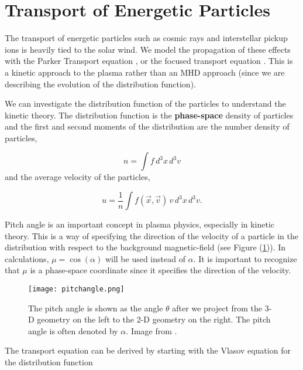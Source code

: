 \documentclass[%
 reprint,
 amsmath,amssymb,
 aps,
]{revtex4-1}
\begin{document}
\section{Transport of Energetic Particles}

The transport of energetic particles such as cosmic rays and interstellar pickup ions is heavily tied to the solar wind. We model the propagation of these effects with the Parker Transport equation \cite{parker65}, or the focused transport equation \cite{foc1} \cite{foc2}. This is a kinetic approach to the plasma rather than an MHD approach (since we are describing the evolution of the distribution function). 

We can investigate the distribution function of the particles to understand the kinetic theory. The distribution function is the \textbf{phase-space} density of particles and the first and second moments of the distribution are the number density of particles,

\begin{equation}
n = \int f \, d^3x\, d^3v
\end{equation}
and the average velocity of the particles,

\begin{equation}
u = \frac{1}{n} \int  f(\vec{x}, \vec{v}) \, v  \, d^3x \, d^3v.
\end{equation}

Pitch angle is an important concept in plasma physics, especially in kinetic theory. This is a way of specifying the direction of the velocity of a particle in the distribution with respect to the background magnetic-field (see Figure (\ref{pitch})). In calculations, $\mu = \cos (\alpha)$ will be used instead of $\alpha$. It is important to recognize that $\mu$ is a phase-space coordinate since it specifies the direction of the velocity.

\begin{center}
\begin{figure}[h] 
\texttt{[image: pitchangle.png]}
\caption{The pitch angle is shown as the angle $\theta$ after we project from the 3-D geometry on the left to the 2-D geometry on the right. The pitch angle is often denoted by $\alpha$. Image from \cite{pitchangle}. \label{pitch}}
\end{figure}
\end{center}

The transport equation can be derived by starting with the Vlasov equation for the distribution function
\end{document}
